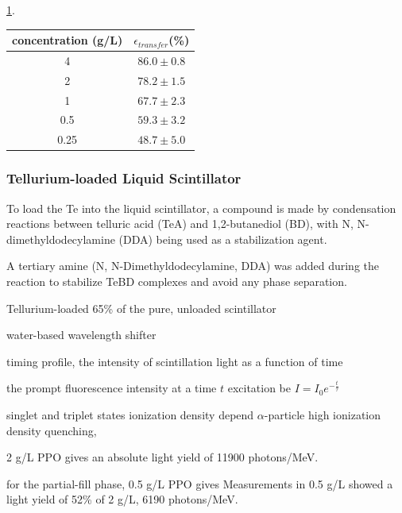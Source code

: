 \ref{transfer_efficiency}\cite{scintillatorPaper}. 
\begin{table}[ht]
\centering
	\begin{tabular}{cc}
		\toprule
concentration (g/L) & $\mathcal{\epsilon}_{transfer}$(\%)	\\
\midrule
4   & $86.0\pm 0.8$\\
2  & $78.2\pm 1.5$\\
1  & $67.7\pm 2.3$\\
0.5 & $59.3\pm 3.2$\\
0.25 & $48.7\pm 5.0$\\
		\bottomrule
	\end{tabular}
	\label{transfer_efficiency}
\end{table}










\subsubsection{Tellurium-loaded Liquid Scintillator}

To load the Te into the liquid scintillator, a compound is made by 
condensation reactions between telluric acid (TeA) and 1,2-butanediol (BD), with N, N-dimethyldodecylamine (DDA) being used as a stabilization agent.

A tertiary amine (N, N-Dimethyldodecylamine, DDA) was added during the reaction to stabilize TeBD complexes and avoid any phase separation. 


Tellurium-loaded 65\% of the pure, unloaded scintillator



water-based wavelength shifter


timing profile, the intensity of scintillation light as a function of time

the prompt fluorescence intensity at a time $t$ excitation be $I=I_0e^{-\frac{t}{\tau}}$



singlet and triplet states 
ionization density 
depend
$\alpha$-particle
high ionization density 
quenching, 




2 g/L PPO gives an absolute light yield of 11900 photons/MeV.


for the partial-fill phase, 0.5 g/L PPO gives Measurements in 0.5 g/L showed a light yield of 52\% of 2 g/L,  
6190 photons/MeV\cite{tanner0p5,joshW1}.

